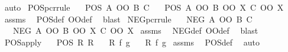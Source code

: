 \begin{isabellebody}
\ auto%
\endisatagproof
{\isafoldproof}%
%
\isadelimproof
\isanewline
%
\endisadelimproof
\isanewline
{}\isamarkupfalse%
\ POS{\isacharunderscore}{\kern0pt}pcr{\isacharunderscore}{\kern0pt}rule{\isacharcolon}{\kern0pt}\isanewline
\ \ \ {\isachardoublequoteopen}POS\ {\isacharparenleft}{\kern0pt}A\ OO\ B{\isacharparenright}{\kern0pt}\ C{\isachardoublequoteclose}\isanewline
\ \ \ {\isachardoublequoteopen}POS\ {\isacharparenleft}{\kern0pt}A\ OO\ B\ OO\ X{\isacharparenright}{\kern0pt}\ {\isacharparenleft}{\kern0pt}C\ OO\ X{\isacharparenright}{\kern0pt}{\isachardoublequoteclose}\isanewline
%
\isadelimproof
%
\endisadelimproof
%
\isatagproof
{}\isamarkupfalse%
\ assms\ \isamarkupfalse%
\ POS{\isacharunderscore}{\kern0pt}def\ OO{\isacharunderscore}{\kern0pt}def\ \isamarkupfalse%
\ blast%
\endisatagproof
{\isafoldproof}%
%
\isadelimproof
\isanewline
%
\endisadelimproof
\isanewline
{}\isamarkupfalse%
\ NEG{\isacharunderscore}{\kern0pt}pcr{\isacharunderscore}{\kern0pt}rule{\isacharcolon}{\kern0pt}\isanewline
\ \ \ {\isachardoublequoteopen}NEG\ {\isacharparenleft}{\kern0pt}A\ OO\ B{\isacharparenright}{\kern0pt}\ C{\isachardoublequoteclose}\isanewline
\ \ \ {\isachardoublequoteopen}NEG\ {\isacharparenleft}{\kern0pt}A\ OO\ B\ OO\ X{\isacharparenright}{\kern0pt}\ {\isacharparenleft}{\kern0pt}C\ OO\ X{\isacharparenright}{\kern0pt}{\isachardoublequoteclose}\isanewline
%
\isadelimproof
%
\endisadelimproof
%
\isatagproof
{}\isamarkupfalse%
\ assms\ \isamarkupfalse%
\ NEG{\isacharunderscore}{\kern0pt}def\ OO{\isacharunderscore}{\kern0pt}def\ \isamarkupfalse%
\ blast%
\endisatagproof
{\isafoldproof}%
%
\isadelimproof
\isanewline
%
\endisadelimproof
\isanewline
{}\isamarkupfalse%
\ POS{\isacharunderscore}{\kern0pt}apply{\isacharcolon}{\kern0pt}\isanewline
\ \ \ {\isachardoublequoteopen}POS\ R\ R{\isacharprime}{\kern0pt}{\isachardoublequoteclose}\isanewline
\ \ \ {\isachardoublequoteopen}R\ f\ g{\isachardoublequoteclose}\isanewline
\ \ \ {\isachardoublequoteopen}R{\isacharprime}{\kern0pt}\ f\ g{\isachardoublequoteclose}\isanewline
%
\isadelimproof
%
\endisadelimproof
%
\isatagproof
{}\isamarkupfalse%
\ assms\ \isamarkupfalse%
\ POS{\isacharunderscore}{\kern0pt}def\ \isamarkupfalse%
\ auto%
\endisatagproof
{\isafoldproof}%
%
\isadelimproof
%
\endisadelimproof

\end{isabellebody}
